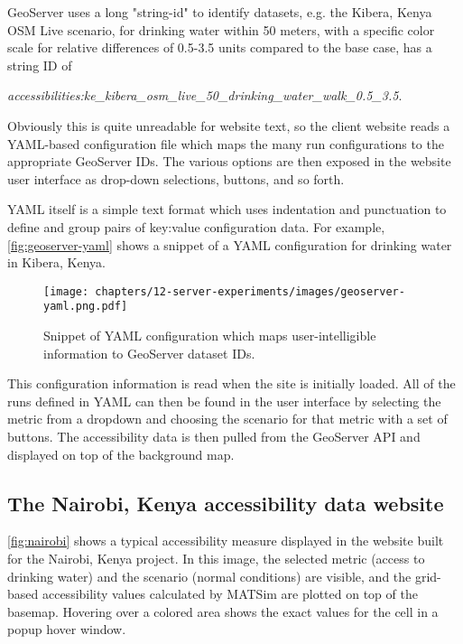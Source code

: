 GeoServer uses a long "string-id" to identify datasets, e.g. the Kibera, Kenya OSM Live scenario, for drinking water within 50 meters, with a specific color scale for relative differences of 0.5-3.5 units compared to the base case, has a string ID of

\emph{accessibilities:ke\_kibera\_osm\_live\_50\_drinking\_water\_walk\_0.5\_3.5}.

Obviously this is quite unreadable for website text, so the client website reads a YAML-based configuration file which maps the many run configurations to the appropriate GeoServer IDs. The various options are then exposed in the website user interface as drop-down selections, buttons, and so forth.

YAML itself is a simple text format which uses indentation and punctuation to define and group pairs of key:value configuration data. For example, \autoref{fig:geoserver-yaml} shows a snippet of a YAML configuration for drinking water in Kibera, Kenya.

\begin{figure}[!ht]
  \texttt{[image: chapters/12-server-experiments/images/geoserver-yaml.png.pdf]}
  \caption[GeoServer YAML configuration example]{Snippet of YAML configuration which maps user-intelligible information to GeoServer dataset IDs.}
  \label{fig:geoserver-yaml}
\end{figure}

This configuration information is read when the site is initially loaded. All of the runs defined in YAML can then be found in the user interface by selecting the metric from a dropdown and choosing the scenario for that metric with a set of buttons. The accessibility data is then pulled from the GeoServer API and displayed on top of the background map.

\hypertarget{server-experiments-geoserver-3}{%
\subsection{The Nairobi, Kenya accessibility data website}
\label{server-experiments-geoserver-3}}

\autoref{fig:nairobi} shows a typical accessibility measure displayed in the website built for the Nairobi, Kenya project. In this image, the selected metric (access to drinking water) and the scenario (normal conditions) are visible, and the grid-based accessibility values calculated by MATSim are plotted on top of the basemap. Hovering over a colored area shows the exact values for the cell in a popup hover window.

